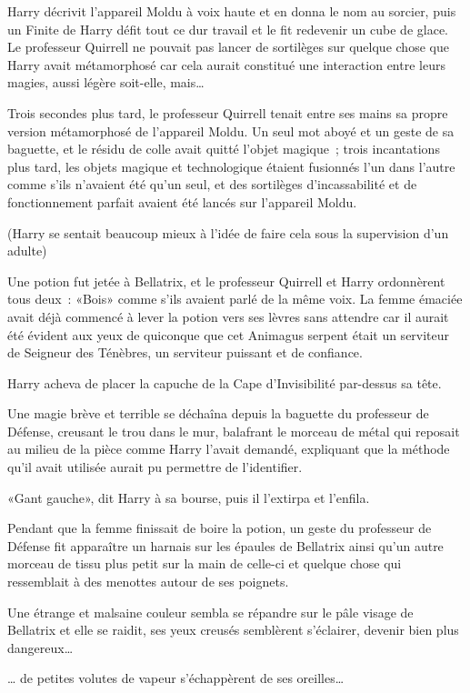 Harry décrivit l'appareil Moldu à voix haute et en donna le nom au sorcier, puis un Finite de Harry défit tout ce dur travail et le fit redevenir un cube de glace. Le professeur Quirrell ne pouvait pas lancer de sortilèges sur quelque chose que Harry avait métamorphosé car cela aurait constitué une interaction entre leurs magies, aussi légère soit-elle, mais…

Trois secondes plus tard, le professeur Quirrell tenait entre ses mains sa propre version métamorphosé de l'appareil Moldu. Un seul mot aboyé et un geste de sa baguette, et le résidu de colle avait quitté l'objet magique~; trois incantations plus tard, les objets magique et technologique étaient fusionnés l'un dans l'autre comme s'ils n'avaient été qu'un seul, et des sortilèges d'incassabilité et de fonctionnement parfait avaient été lancés sur l'appareil Moldu.

(Harry se sentait beaucoup mieux à l'idée de faire cela sous la supervision d'un adulte)

Une potion fut jetée à Bellatrix, et le professeur Quirrell et Harry ordonnèrent tous deux~: «Bois» comme s'ils avaient parlé de la même voix. La femme émaciée avait déjà commencé à lever la potion vers ses lèvres sans attendre car il aurait été évident aux yeux de quiconque que cet Animagus serpent était un serviteur de Seigneur des Ténèbres, un serviteur puissant et de confiance.

Harry acheva de placer la capuche de la Cape d'Invisibilité par-dessus sa tête.

Une magie brève et terrible se déchaîna depuis la baguette du professeur de Défense, creusant le trou dans le mur, balafrant le morceau de métal qui reposait au milieu de la pièce comme Harry l'avait demandé, expliquant que la méthode qu'il avait utilisée aurait pu permettre de l'identifier.

«Gant gauche», dit Harry à sa bourse, puis il l'extirpa et l'enfila.

Pendant que la femme finissait de boire la potion, un geste du professeur de Défense fit apparaître un harnais sur les épaules de Bellatrix ainsi qu'un autre morceau de tissu plus petit sur la main de celle-ci et quelque chose qui ressemblait à des menottes autour de ses poignets.

Une étrange et malsaine couleur sembla se répandre sur le pâle visage de Bellatrix et elle se raidit, ses yeux creusés semblèrent s'éclairer, devenir bien plus dangereux…

… de petites volutes de vapeur s'échappèrent de ses oreilles…

